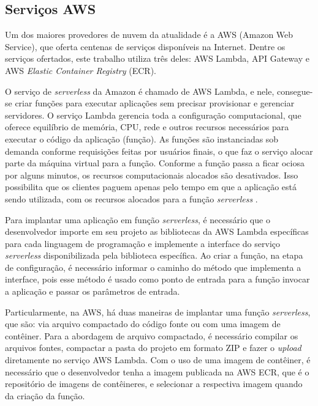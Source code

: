 \documentclass[10pt,conference]{IEEEtran}
\begin{document}
\subsection{Serviços AWS}
\label{subsec:aws_services}

Um dos maiores provedores de nuvem da atualidade é a AWS (Amazon Web Service), que oferta centenas de serviços disponíveis na Internet. Dentre os serviços ofertados, este trabalho utiliza três deles: AWS Lambda, API Gateway e AWS \textit{Elastic Container Registry} (ECR).

O serviço de \textit{serverless} da Amazon é chamado de AWS Lambda, e nele, consegue-se criar funções para executar aplicações sem precisar provisionar e gerenciar servidores. 
O serviço Lambda gerencia toda a configuração computacional, que oferece equilíbrio de memória, CPU, rede e outros recursos necessários para executar o código da aplicação (função).
As funções são instanciadas sob demanda conforme requisições feitas por usuários finais, o que faz o serviço alocar parte da máquina virtual para a função. Conforme a função passa a ficar ociosa por alguns minutos, os recursos computacionais alocados são desativados. Isso possibilita que os clientes paguem apenas pelo tempo em que a aplicação está sendo utilizada, com os recursos alocados para a função \textit{serverless} \cite{aws_2023_what_is_lambda}.

Para implantar uma aplicação em função \textit{serverless}, é necessário que o desenvolvedor importe em seu projeto as bibliotecas da AWS Lambda específicas para cada linguagem de programação e implemente a interface do serviço \textit{serverless} disponibilizada pela biblioteca específica. Ao criar a função, na etapa de configuração, é necessário informar o caminho do método que implementa a interface, pois esse método é usado como ponto de entrada para a função invocar a aplicação e passar os parâmetros de entrada.

Particularmente, na AWS, há duas maneiras de implantar uma função \textit{serverless}, que são: via arquivo compactado do código fonte ou com uma imagem de contêiner. Para a abordagem de arquivo compactado, é necessário compilar os arquivos fontes, compactar a pasta do projeto em formato ZIP e fazer o \textit{upload} diretamente no serviço AWS Lambda. Com o uso de uma imagem de contêiner, é necessário que o desenvolvedor tenha a imagem publicada na AWS ECR, que é o repositório de imagens de contêineres, e selecionar a respectiva imagem quando da criação da função.
\end{document}
